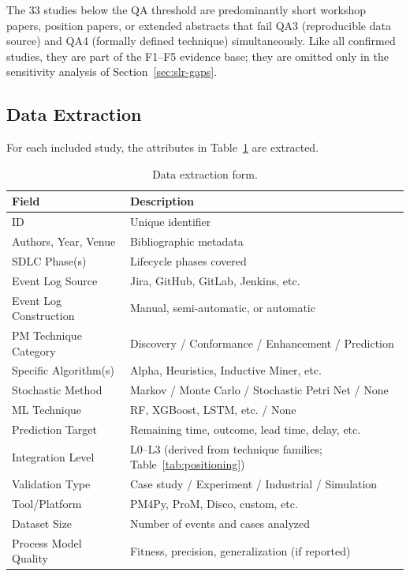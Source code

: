 

The 33 studies below the QA threshold are predominantly short workshop papers,
position papers, or extended abstracts that fail QA3 (reproducible data
source) and QA4 (formally defined technique) simultaneously. Like all
confirmed studies, they are part of the F1--F5 evidence base; they are
omitted only in the sensitivity analysis of Section~\ref{sec:slr-gaps}.


\subsection{Data Extraction}
\label{sec:slr-extraction}

For each included study, the attributes in Table~\ref{tab:extraction} are
extracted.

\begin{table}[htbp]
\centering
\caption{Data extraction form.}
\label{tab:extraction}
\small
\setlength{\tabcolsep}{4pt}
\begin{tabular}{p{3.6cm} p{8.1cm}}
\toprule
\textbf{Field} & \textbf{Description} \\
\midrule
ID                           & Unique identifier \\
Authors, Year, Venue         & Bibliographic metadata \\
SDLC Phase(s)                & Lifecycle phases covered \\
Event Log Source             & Jira, GitHub, GitLab, Jenkins, etc. \\
Event Log Construction       & Manual, semi-automatic, or automatic \\
PM Technique Category        & Discovery / Conformance / Enhancement / Prediction \\
Specific Algorithm(s)        & Alpha, Heuristics, Inductive Miner, etc. \\
Stochastic Method            & Markov / Monte Carlo / Stochastic Petri Net / None \\
ML Technique                 & RF, XGBoost, LSTM, etc. / None \\
Prediction Target            & Remaining time, outcome, lead time, delay, etc. \\
Integration Level            & L0--L3 (derived from technique families; Table~\ref{tab:positioning}) \\
Validation Type              & Case study / Experiment / Industrial / Simulation \\
Tool/Platform                & PM4Py, ProM, Disco, custom, etc. \\
Dataset Size                 & Number of events and cases analyzed \\
Process Model Quality        & Fitness, precision, generalization (if reported) \\
\bottomrule
\end{tabular}
\end{table}


